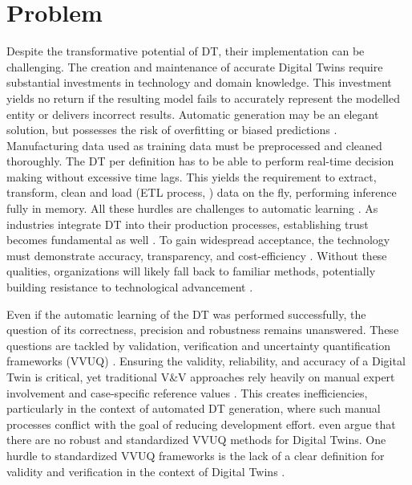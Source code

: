 \section{Problem}
Despite the transformative potential of DT, their implementation can be challenging. The creation and maintenance of accurate Digital Twins require substantial investments in technology and domain knowledge. This investment yields no return if the resulting model fails to accurately represent the modelled entity or delivers incorrect results. Automatic generation may be an elegant solution, but possesses the risk of overfitting or biased predictions \parencite{gemanbias}. Manufacturing data used as training data must be preprocessed and cleaned thoroughly. The DT per definition has to be able to perform real-time decision making without excessive time lags. This yields the requirement to extract, transform, clean and load (ETL process, \cite{vassiliadis2002conceptual}) data on the fly, performing inference fully in memory. All these hurdles are challenges to automatic learning \parencite{ribeiro2016should,zhao2024data}. As industries integrate DT into their production processes, establishing trust becomes fundamental as well \parencite{trauer2022digital,arrieta2020explainable}. To gain widespread acceptance, the technology must demonstrate accuracy, transparency, and cost-efficiency \parencite{Wright2020amse,Shao2023mfglet}. Without these qualities, organizations will likely fall back to familiar methods, potentially building resistance to technological advancement \parencite{lapointe2005multilevel}.

Even if the automatic learning of the DT was performed successfully, the question of its correctness, precision and robustness remains unanswered. These questions are tackled by validation, verification and uncertainty quantification frameworks (VVUQ) \parencite{sel2025survey}. Ensuring the validity, reliability, and accuracy of a Digital Twin is critical, yet traditional V&V approaches rely heavily on manual expert involvement and case-specific reference values \parencite{Bitencourt2023,hua2022validation}. This creates inefficiencies, particularly in the context of automated DT generation, where such manual processes conflict with the goal of reducing development effort. \cite{hua2022validation} even argue that there are no robust and standardized VVUQ methods for Digital Twins. One hurdle to standardized VVUQ frameworks is the lack of a clear definition for validity and verification in the context of Digital Twins \parencite{Bitencourt2023}.

